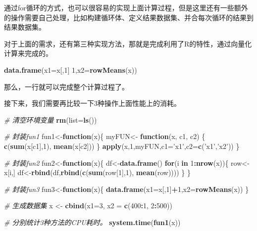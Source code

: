 \documentclass[]{book}
\newenvironment{Shaded}{\begin{snugshade}}{\end{snugshade}}
\newcommand{\CommentTok}[1]{\textcolor[rgb]{0.56,0.35,0.01}{\textit{#1}}}
\newcommand{\ControlFlowTok}[1]{\textcolor[rgb]{0.13,0.29,0.53}{\textbf{#1}}}
\newcommand{\DataTypeTok}[1]{\textcolor[rgb]{0.13,0.29,0.53}{#1}}
\newcommand{\DecValTok}[1]{\textcolor[rgb]{0.00,0.00,0.81}{#1}}
\newcommand{\KeywordTok}[1]{\textcolor[rgb]{0.13,0.29,0.53}{\textbf{#1}}}
\newcommand{\NormalTok}[1]{#1}
\newcommand{\OperatorTok}[1]{\textcolor[rgb]{0.81,0.36,0.00}{\textbf{#1}}}
\newcommand{\StringTok}[1]{\textcolor[rgb]{0.31,0.60,0.02}{#1}}
\begin{document}
通过for循环的方式，也可以很容易的实现上面计算过程，但是这里还有一些额外的操作需要自己处理，比如构建循环体、定义结果数据集、并合每次循环的结果到结果数据集。

对于上面的需求，还有第三种实现方法，那就是完成利用了R的特性，通过向量化计算来完成的。

\begin{Shaded}
\begin{Highlighting}[]
\KeywordTok{data.frame}\NormalTok{(}\DataTypeTok{x1=}\NormalTok{x[,}\DecValTok{1}\NormalTok{] }\DecValTok{1}\NormalTok{,}\DataTypeTok{x2=}\KeywordTok{rowMeans}\NormalTok{(x))}
\end{Highlighting}
\end{Shaded}

那么，一行就可以完成整个计算过程了。

接下来，我们需要再比较一下3种操作上面性能上的消耗。

\begin{Shaded}
\begin{Highlighting}[]
\CommentTok{# 清空环境变量}
 \KeywordTok{rm}\NormalTok{(}\DataTypeTok{list=}\KeywordTok{ls}\NormalTok{())}

\CommentTok{# 封装fun1}
\NormalTok{ fun1<-}\ControlFlowTok{function}\NormalTok{(x)\{}
\NormalTok{   myFUN<-}\StringTok{ }\ControlFlowTok{function}\NormalTok{(x, c1, c2) \{}
     \KeywordTok{c}\NormalTok{(}\KeywordTok{sum}\NormalTok{(x[c1],}\DecValTok{1}\NormalTok{), }\KeywordTok{mean}\NormalTok{(x[c2])) }
\NormalTok{   \}}
   \KeywordTok{apply}\NormalTok{(x,}\DecValTok{1}\NormalTok{,myFUN,}\DataTypeTok{c1=}\StringTok{'x1'}\NormalTok{,}\DataTypeTok{c2=}\KeywordTok{c}\NormalTok{(}\StringTok{'x1'}\NormalTok{,}\StringTok{'x2'}\NormalTok{))}
\NormalTok{ \}}

\CommentTok{# 封装fun2}
\NormalTok{ fun2<-}\ControlFlowTok{function}\NormalTok{(x)\{}
\NormalTok{   df<-}\KeywordTok{data.frame}\NormalTok{()}
   \ControlFlowTok{for}\NormalTok{(i }\ControlFlowTok{in} \DecValTok{1}\OperatorTok{:}\KeywordTok{nrow}\NormalTok{(x))\{}
\NormalTok{     row<-x[i,]}
\NormalTok{     df<-}\KeywordTok{rbind}\NormalTok{(df,}\KeywordTok{rbind}\NormalTok{(}\KeywordTok{c}\NormalTok{(}\KeywordTok{sum}\NormalTok{(row[}\DecValTok{1}\NormalTok{],}\DecValTok{1}\NormalTok{), }\KeywordTok{mean}\NormalTok{(row))))}
\NormalTok{   \}}
\NormalTok{ \}}

\CommentTok{# 封装fun3}
\NormalTok{ fun3<-}\ControlFlowTok{function}\NormalTok{(x)\{}
   \KeywordTok{data.frame}\NormalTok{(}\DataTypeTok{x1=}\NormalTok{x[,}\DecValTok{1}\NormalTok{]}\OperatorTok{+}\DecValTok{1}\NormalTok{,}\DataTypeTok{x2=}\KeywordTok{rowMeans}\NormalTok{(x))}
\NormalTok{ \}}

\CommentTok{# 生成数据集}
\NormalTok{x <-}\StringTok{ }\KeywordTok{cbind}\NormalTok{(}\DataTypeTok{x1=}\DecValTok{3}\NormalTok{, }\DataTypeTok{x2 =} \KeywordTok{c}\NormalTok{(}\DecValTok{400}\OperatorTok{:}\DecValTok{1}\NormalTok{, }\DecValTok{2}\OperatorTok{:}\DecValTok{500}\NormalTok{))}

\CommentTok{# 分别统计3种方法的CPU耗时。}
 \KeywordTok{system.time}\NormalTok{(}\KeywordTok{fun1}\NormalTok{(x))}
\end{Highlighting}
\end{Shaded}
\end{document}
